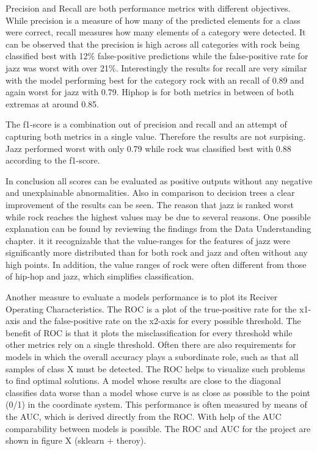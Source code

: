 Precision and Recall are both performance metrics with different objectives. While precision is a measure of how many of the 
predicted elements for a class were correct, recall measures how many elements of a category were detected. It can be observed that 
the precision is high across all categories with rock being classified best with 12\% false-positive predictions while 
the false-positive rate for jazz was worst with over 21\%. Interestingly the results for recall are very similar with the model 
performing best for the category rock with an recall of 0.89 and again worst for jazz with 0.79. Hiphop is for both metrics in 
between of both extremas at around 0.85. 

The f1-score is a combination out of precision and recall and an attempt of capturing both metrics in a single value. Therefore
the results are not surpising. Jazz performed worst with only 0.79 while rock was classified best with 0.88 according to the 
f1-score. 

In conclusion all scores can be evaluated as positive outputs without any negative and unexplainable abnormalities. Also in comparison 
to decision trees a clear improvement of the results can be seen. The reason that jazz is ranked worst while rock reaches the 
highest values may be due to several reasons. One possible explanation can be found by reviewing the findings from the Data 
Understanding chapter. it it recognizable that the value-ranges for the features of jazz were significantly more distributed 
than for both rock and jazz and often without any high points. In addition, the value ranges of rock were often different from 
those of hip-hop and jazz, which simplifies classification. 

Another measure to evaluate a models performance is to plot its Reciver Operating Characteristics. The ROC is a plot of the true-positive
rate for the x1-axis and the false-positive rate on the x2-axis for every possible threshold. The benefit of ROC is that it plots the 
misclassification for every threshold while other metrics rely on a single threshold. Often there are also requirements for 
models in which the overall accuracy plays a subordinate role, such as that all samples of class X must be detected. The ROC helps 
to visualize such problems to find optimal solutions. A model whose results are close to the diagonal classifies data worse than a 
model whose curve is as close as possible to the point (0/1) in the coordinate system. This performance is often measured by means of 
the AUC, which is derived directly from the ROC. With help of the AUC comparability between models is possible. The ROC and AUC for 
the project are shown in figure X (sklearn + theroy).

